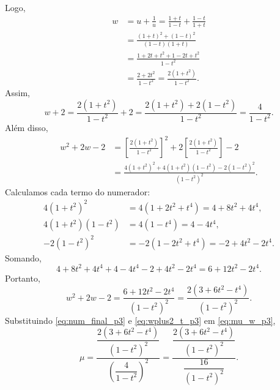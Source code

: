 \documentclass[12pt,a4paper]{article}
\begin{document}
%
Logo,
%
\begin{align}
    w
    &=
    u+\frac{1}{u}
    =
    \frac{1+t}{1-t}
    +
    \frac{1-t}{1+t}
    \nonumber\\[4pt]
    &=
    \frac{(1+t)^2+(1-t)^2}{(1-t)(1+t)}
    \nonumber\\[4pt]
    &=
    \frac{1+2t+t^2+1-2t+t^2}{1-t^2}
    \nonumber\\[4pt]
    &=
    \frac{2+2t^2}{1-t^2}
    =
    \frac{2(1+t^2)}{1-t^2}.
    \label{eq:w_t_p3}
\end{align}
%
Assim,
%
\begin{equation}
    w+2
    =
    \frac{2(1+t^2)}{1-t^2}+2
    =
    \frac{2(1+t^2)+2(1-t^2)}{1-t^2}
    =
    \frac{4}{1-t^2}.
    \label{eq:wplus2_t_p3}
\end{equation}
%
Além disso,
%
\begin{align}
    w^2+2w-2
    &=
    \left[
        \frac{2(1+t^2)}{1-t^2}
    \right]^2
    +
    2\left[
        \frac{2(1+t^2)}{1-t^2}
    \right]
    -2
    \nonumber\\[4pt]
    &=
    \frac{
        4(1+t^2)^2
        +
        4(1+t^2)(1-t^2)
        -
        2(1-t^2)^2
    }
    {(1-t^2)^2}.
    \label{eq:num_common_p3}
\end{align}
%
Calculamos cada termo do numerador:
%
\begin{align}
    4(1+t^2)^2
    &=
    4(1+2t^2+t^4)
    =
    4+8t^2+4t^4,
    \nonumber\\[4pt]
    4(1+t^2)(1-t^2)
    &=
    4(1-t^4)
    =
    4-4t^4,
    \nonumber\\[4pt]
    -2(1-t^2)^2
    &=
    -2(1-2t^2+t^4)
    =
    -2+4t^2-2t^4.
\end{align}
%
Somando,
%
\begin{equation}
    4+8t^2+4t^4
    +
    4-4t^4
    -
    2+4t^2-2t^4
    =
    6+12t^2-2t^4.
\end{equation}
%
Portanto,
%
\begin{equation}
    w^2+2w-2
    =
    \frac{
        6+12t^2-2t^4
    }
    {(1-t^2)^2}
    =
    \frac{
        2(3+6t^2-t^4)
    }
    {(1-t^2)^2}.
    \label{eq:num_final_p3}
\end{equation}
%
Substituindo \eqref{eq:num_final_p3} e \eqref{eq:wplus2_t_p3} em
\eqref{eq:mu_w_p3},
%
\begin{equation}
    \mu
    =
    \frac{
        \dfrac{2(3+6t^2-t^4)}{(1-t^2)^2}
    }
    {
        \left(
            \dfrac{4}{1-t^2}
        \right)^2
    }
    =
    \frac{
        \dfrac{2(3+6t^2-t^4)}{(1-t^2)^2}
    }
    {
        \dfrac{16}{(1-t^2)^2}
    }.
\end{equation}
\end{document}
